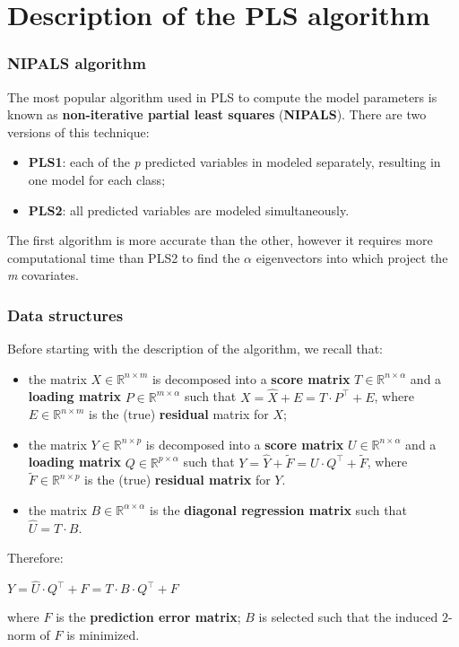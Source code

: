 \section{Description of the PLS  algorithm}

\begin{frame}[fragile]
	\frametitle{NIPALS algorithm}
	The most popular algorithm used in PLS to compute the model parameters is known as \textbf{non-iterative partial least squares} (\textbf{NIPALS}). There are two versions of this technique:
	\begin{itemize}
		\item \textbf{PLS1}: each of the \textit{p} predicted variables in modeled separately, resulting in one model for each class;
		\item \textbf{PLS2}: all predicted variables are modeled simultaneously.
	\end{itemize}
	The first algorithm is more accurate than the other, however it requires more computational time than PLS2 to find the $\alpha$ eigenvectors into which project the \textit{m} covariates. 
\end{frame}

\begin{frame}
	\frametitle{Data structures}
	Before starting with the description of the algorithm, we recall that:
	\begin{itemize}
		\item the matrix $X \in \mathbb{R}^{n\times m}$ is decomposed into a \textbf{score matrix} $T \in \mathbb{R}^{n\times\alpha}$ and a \textbf{loading matrix} $P \in \mathbb{R}^{m\times\alpha}$ such that $X = \hat{X} + E = T\cdot P^\top + E$, where $E \in \mathbb{R}^{n\times m}$ is the (true) \textbf{residual} matrix for $X$;
		\item the matrix $Y \in \mathbb{R}^{n\times p}$ is decomposed into a \textbf{score matrix} $U\in\mathbb{R}^{n\times\alpha}$ and a \textbf{loading matrix} $Q\in \mathbb{R}^{p\times\alpha}$ such that $Y = \hat{Y} + \widetilde{F} = U\cdot Q^\top + \widetilde{F}$, where $\widetilde{F}\in \mathbb{R}^{n\times p}$ is the (true) \textbf{residual matrix} for $Y$.
		\item the matrix $B\in \mathbb{R}^{\alpha\times\alpha}$ is the \textbf{diagonal regression matrix} such that $\hat{U} = T\cdot B$.
	\end{itemize}
	Therefore:
	\begin{center}
		$Y = \hat{U}\cdot Q^\top + F =  T\cdot B\cdot Q^\top + F$
	\end{center}
	where $F$ is the \textbf{prediction error matrix}; $B$ is selected such that the induced $2$-norm of $F$ is minimized. 
\end{frame}


